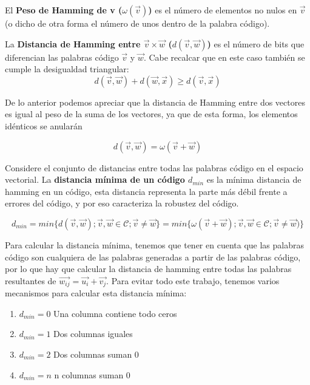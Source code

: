 \documentclass{article}
\begin{document}
El \textbf{Peso de Hamming de v ($\omega (\vec{v})$)} es el número de elementos no nulos en $\vec{v}$ (o dicho de otra forma el número de unos dentro de la palabra código).

La \textbf{Distancia de Hamming entre $\vec{v} \times \vec{w}$ ($d(\vec{v}, \vec{w})$)} es el número de bits que diferencian las palabras código $\vec{v}$ y $\vec{w}$. Cabe recalcar que en este caso también se cumple la desigualdad triangular:
\begin{equation}
    d(\vec{v}, \vec{w}) + d(\vec{w}, \vec{x}) \geq d(\vec{v}, \vec{x})
\end{equation}

De lo anterior podemos apreciar que la distancia de Hamming entre dos vectores es igual al peso de la suma de los vectores, ya que de esta forma, los elementos idénticos se anularán

\begin{equation}
    d(\vec{v}, \vec{w}) = \omega(\vec{v}+\vec{w})
\end{equation}

Considere el conjunto de distancias entre todas las palabras código en el espacio vectorial. La \textbf{distancia mínima de un código $d_{min}$} es la mínima distancia de hamming en un código, esta distancia representa la parte más débil frente a errores del código, y por eso caracteriza la robustez del código.

\begin{equation}
    d_{min} = min\{d(\vec{v},\vec{w});\vec{v},\vec{w}\in\mathcal{C};\vec{v}\neq\vec{w}\} = min\{\omega(\vec{v}+\vec{w});\vec{v},\vec{w}\in\mathcal{C};\vec{v}\neq\vec{w})\}
\end{equation}

Para calcular la distancia mínima, tenemos que tener en cuenta que las palabras código son cualquiera de las palabras generadas a partir de las palabras código, por lo que hay que calcular la distancia de hamming entre todas las palabras resultantes de $\vec{w_{ij}} = \vec{u_i} + \vec{v_j}$. Para evitar todo este trabajo, tenemos varios mecanismos para calcular esta distancia mínima:

\begin{enumerate}
    \item \textbf{$d_{min} = 0$} Una columna contiene todo ceros
    \item \textbf{$d_{min} = 1$} Dos columnas iguales
    \item \textbf{$d_{min} = 2$} Dos columnas suman 0
    \item \textbf{$d_{min} = n$} n columnas suman 0
\end{enumerate}
\end{document}
